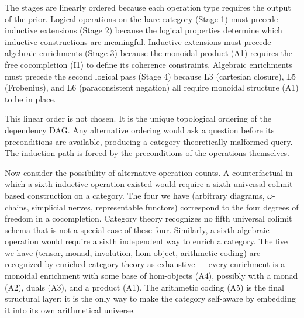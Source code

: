 \documentclass[12pt,a4paper]{article}
\begin{document}
\begin{center}
\end{center}

The stages are linearly ordered because each operation type requires the output of the prior. Logical operations on the bare category (Stage 1) must precede inductive extensions (Stage 2) because the logical properties determine which inductive constructions are meaningful. Inductive extensions must precede algebraic enrichments (Stage 3) because the monoidal product (A1) requires the free cocompletion (I1) to define its coherence constraints. Algebraic enrichments must precede the second logical pass (Stage 4) because L3 (cartesian closure), L5 (Frobenius), and L6 (paraconsistent negation) all require monoidal structure (A1) to be in place.

This linear order is not chosen. It is the unique topological ordering of the dependency DAG. Any alternative ordering would ask a question before its preconditions are available, producing a category-theoretically malformed query. The induction path is forced by the preconditions of the operations themselves.

Now consider the possibility of alternative operation counts. A counterfactual in which a sixth inductive operation existed would require a sixth universal colimit-based construction on a category. The four we have (arbitrary diagrams, $\omega$-chains, simplicial nerves, representable functors) correspond to the four degrees of freedom in a cocompletion. Category theory recognizes no fifth universal colimit schema that is not a special case of these four. Similarly, a sixth algebraic operation would require a sixth independent way to enrich a category. The five we have (tensor, monad, involution, hom-object, arithmetic coding) are recognized by enriched category theory as exhaustive --- every enrichment is a monoidal enrichment with some base of hom-objects (A4), possibly with a monad (A2), duals (A3), and a product (A1). The arithmetic coding (A5) is the final structural layer: it is the only way to make the category self-aware by embedding it into its own arithmetical universe.
\end{document}
